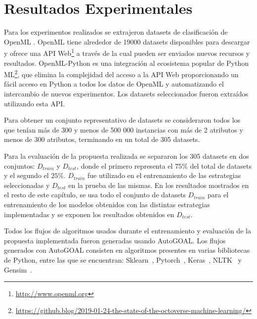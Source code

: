 \documentclass[a4paper,12pt]{article}
\begin{document}
\section{Resultados Experimentales}

Para los experimentos realizados se extrajeron datasets de clasificación de OpenML \cite{vanschoren2014openml}. OpenML tiene alrededor de 19000 datasets disponibles para descargar y ofrece una API Web\footnote{\url{http://www.openml.org}} a través de la cual pueden ser enviados nuevos recursos y resultados. OpenML-Python \cite{feurer2019openmlpy} es una integración al ecosistema popular de Python ML\footnote{\url{https://github.blog/2019-01-24-the-state-of-the-octoverse-machine-learning/}}, que elimina la complejidad del acceso a la API Web proporcionando un fácil acceso en Python a todos los datos de OpenML y automatizando el intercambio de nuevos experimentos. Los datasets seleccionados fueron extraídos utilizando esta API.

Para obtener un conjunto representativo de datasets se consideraron todos los que tenían más de 300  y menos de 500 000 instancias con más de 2 atributos y menos de 300 atributos, terminando en un total de 305 datasets. 

Para la evaluación de la propuesta realizada se separaron los 305 datasets en dos conjuntos: $D_{train}$ y $D_{test}$, donde el primero representa el $75\%$ del total de datasets y el segundo el $25\%$. $D_{train}$ fue utilizado en el entrenamiento de las estrategias seleccionadas y $D_{test}$ en la prueba de las mismas. %
En los resultados mostrados en el resto de este capítulo, se usa todo el conjunto de datasets $D_{train}$ para el entrenamiento de los modelos obtenidos con las distintas estrategias implementadas y se exponen los resultados obtenidos en $D_{test}$.


Todos los flujos de algoritmos usados durante el entrenamiento y evaluación de la propuesta implementada fueron generadas usando AutoGOAL. Los flujos generados con AutoGOAL consisten en algoritmos presentes en varias bibliotecas de Python, entre las que se encuentran: Sklearn~\cite{scikit-learn}, Pytorch~\cite{paszke2019pytorch}, Keras~\cite{chollet2015keras}, NLTK~\cite{bird2009natural} y Gensim~\cite{khosrovian2008gensim}.
\end{document}
